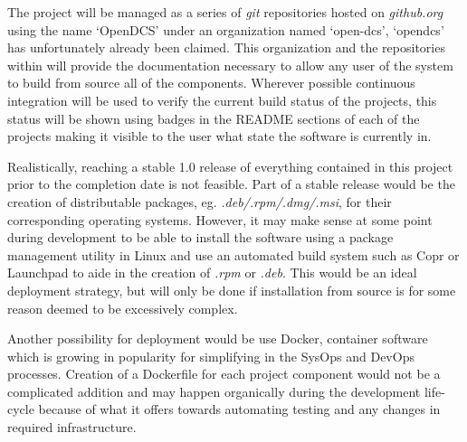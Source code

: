 \documentclass[11pt]{article}
\begin{document}
          The project will be managed as a series of \emph{git} repositories hosted
          on \emph{github.org} using the name `OpenDCS' under an organization named
          `open-dcs', `opendcs' has unfortunately already been claimed. This
          organization and the repositories within will provide the documentation
          necessary to allow any user of the system to build from source all of the
          components. Wherever possible continuous integration will be used to
          verify the current build status of the projects, this status will be shown
          using badges in the README sections of each of the projects making it
          visible to the user what state the software is currently in.

          Realistically, reaching a stable 1.0 release of everything contained in
          this project prior to the completion date is not feasible. Part of a
          stable release would be the creation of distributable packages, eg.
          \emph{.deb/.rpm/.dmg/.msi}, for their corresponding operating systems.
          However, it may make sense at some point during development to be able
          to install the software using a package management utility in Linux and use
          an automated build system such as Copr or Launchpad to aide in the creation
          of \emph{.rpm} or \emph{.deb}. This would be an ideal deployment strategy,
          but will only be done if installation from source is for some reason deemed
          to be excessively complex.

          Another possibility for deployment would be use Docker, container software
          which is growing in popularity for simplifying in the SysOps and DevOps
          processes. Creation of a Dockerfile for each project component would not
          be a complicated addition and may happen organically during the development
          life-cycle because of what it offers towards automating testing and any
          changes in required infrastructure.


\end{document}
